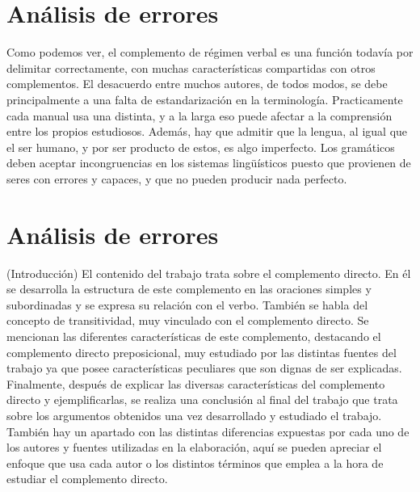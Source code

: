 \documentclass[12pt, a4paper, oneside]{report}
\begin{document}

\section{Análisis de errores}
Como podemos ver, %
el complemento de régimen verbal es una función todavía por %
delimitar correctamente, con muchas características
compartidas con otros complementos. El desacuerdo entre muchos
autores, de todos modos, %
 se debe principalmente a una falta de estandarización
en la terminología. Practicamente %
 cada manual usa una distinta, y a la larga eso puede
afectar a la comprensión entre los propios
estudiosos. Además, hay que admitir que la
lengua, al igual que el ser humano, y por ser
producto de estos, es algo imperfecto. Los
gramáticos deben aceptar incongruencias en
los sistemas lingüísticos puesto que provienen de seres con errores y capaces,
y que no pueden producir nada perfecto.

\section{Análisis de errores}
(Introducción)
El contenido del trabajo trata sobre el complemento directo. %
En él se desarrolla la estructura de este complemento en las
oraciones simples y subordinadas y se expresa su relación con el
verbo.
También se habla del concepto de transitividad, muy vinculado
con el complemento directo.
Se
mencionan
las
diferentes
características
de
este
complemento, destacando el complemento directo preposicional,
muy estudiado por las distintas fuentes del trabajo ya que posee
características peculiares que son dignas de ser explicadas.
Finalmente, después de explicar las diversas características del
complemento directo y ejempliﬁcarlas, se realiza una conclusión
al ﬁnal del trabajo que trata sobre los argumentos obtenidos una
vez desarrollado y estudiado el trabajo. También hay un apartado
con las distintas diferencias expuestas por cada uno de los autores
y fuentes utilizadas en la elaboración, aquí se pueden apreciar el
enfoque que usa cada autor o los distintos términos que emplea a
la hora de estudiar el complemento directo.

\end{document}
